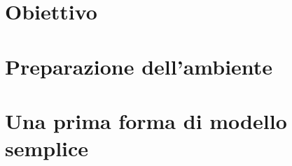 \section{Obiettivo}
\section{Preparazione dell'ambiente}
\section{Una prima forma di modello semplice}